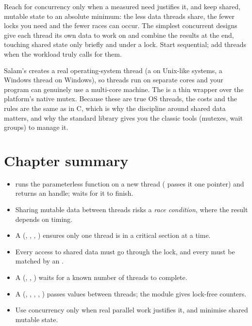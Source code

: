 \begin{tip}
Reach for concurrency only when a measured need justifies it, and keep shared,
mutable state to an absolute minimum: the less data threads share, the fewer
locks you need and the fewer races can occur. The simplest concurrent designs give
each thread its own data to work on and combine the results at the end, touching
shared state only briefly and under a lock. Start sequential; add threads when the
workload truly calls for them.
\end{tip}

\begin{deep}
Salam's  creates a real operating-system thread (a  on
Unix-like systems, a Windows thread on Windows), so threads run on separate cores
and your program can genuinely use a multi-core machine. The  is
a thin wrapper over the platform's native mutex. Because these are true OS
threads, the costs and the rules are the same as in C, which is why the
discipline around shared data matters, and why the standard library gives you the
classic tools (mutexes, wait groups) to manage it.
\end{deep}

\section{Chapter summary}

\begin{itemize}[leftmargin=1.4em]
  \item {} runs the parameterless function  on a new thread
        ( passes it one pointer) and returns an  handle;  waits for it to
        finish.
  \item Sharing mutable data between threads risks a \emph{race condition}, where
        the result depends on timing.
  \item A  (, , ,
        ) ensures only one thread is in a critical section at a time.
  \item Every access to shared data must go through the lock, and every
         must be matched by an .
  \item A  (, , ) waits for a
        known number of threads to complete.
  \item A  (, , ,
        , ) passes values between threads; the
         module gives lock-free counters.
  \item Use concurrency only when real parallel work justifies it, and minimise
        shared mutable state.
\end{itemize}

